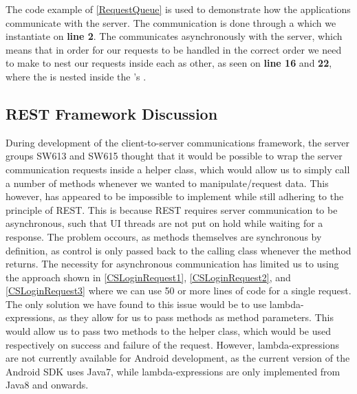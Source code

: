 The code example of \autoref{RequestQueue} is used to demonstrate how the
applications communicate with the server. The communication is done through a
 which we instantiate on \textbf{line 2}. The
 communicates asynchronously with the server, which means
that in order for our requests to be handled in the correct order we need to
make to nest our requests inside each as other, as seen on \textbf{line 16} and
\textbf{22}, where the  is nested inside the
's .

\subsection{REST Framework Discussion}
\nl
During development of the client-to-server communications framework, the server
groups SW613 and SW615 thought that it would be possible to wrap the server
communication requests inside a helper class, which would allow us to simply
call a number of methods whenever we wanted to manipulate/request data. This
however, has appeared to be impossible to implement while still adhering to the
principle of REST. This is because REST requires server communication to be
asynchronous, such that UI threads are not put on hold while waiting for a
response. The problem occours, as methods themselves are synchronous by
definition, as control is only passed back to the calling class whenever the
method returns. The necessity for asynchronous communication has limited us to
using the approach shown in \autoref{CSLoginRequest1}, \autoref{CSLoginRequest2}, and
\autoref{CSLoginRequest3} where we can use 50 or more lines of code for a
single request. The only solution we have found to this issue would be to use
lambda-expressions, as they allow for us to pass methods as method parameters.
This would allow us to pass two methods to the helper class, which would be used
respectively on success and failure of the request. However, lambda-expressions
are not currently available for Android development, as the current version of
the Android SDK uses Java7, while lambda-expressions are only implemented from
Java8 and onwards.













